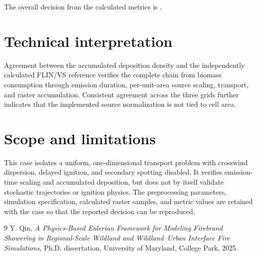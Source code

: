 The overall decision from the calculated metrics is \textbf{}.

\section{Technical interpretation}
Agreement between the accumulated deposition density and the independently calculated FLIN/VS reference verifies the complete chain from biomass consumption through emission duration, per-unit-area source scaling, transport, and raster accumulation. Consistent agreement across the three grids further indicates that the implemented source normalization is not tied to cell area.

\section{Scope and limitations}
This case isolates a uniform, one-dimensional transport problem with crosswind dispersion, delayed ignition, and secondary spotting disabled. It verifies emission-time scaling and accumulated deposition, but does not by itself validate stochastic trajectories or ignition physics. The preprocessing parameters, simulation specification, calculated raster samples, and metric values are retained with the case so that the reported decision can be reproduced.

\begin{thebibliography}{9}
Y. Qin, \emph{A Physics-Based Eulerian Framework for Modeling Firebrand
Showering in Regional-Scale Wildland and Wildland--Urban Interface Fire
Simulations}, Ph.D. dissertation, University of Maryland, College Park, 2025.
\end{thebibliography}
